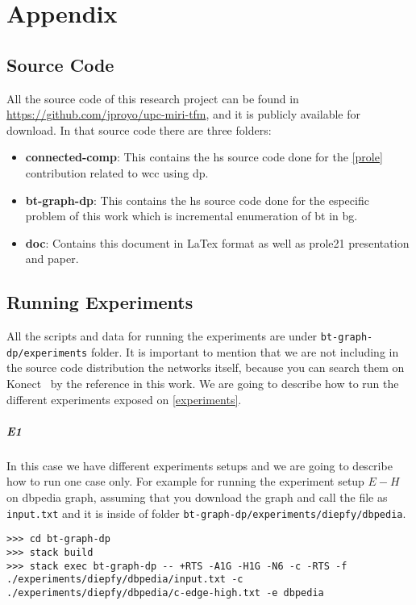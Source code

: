 \chapter{Appendix}
\section{Source Code}
All the source code of this research project can be found in \url{https://github.com/jproyo/upc-miri-tfm}, and it is publicly available for download.
In that source code there are three folders:

\begin{itemize}
  \item \textbf{connected-comp}: This contains the \acrshort{hs} source code done for the \autoref{prole} contribution related to \acrfull{wcc} using \acrshort{dp}.
  \item \textbf{bt-graph-dp}: This contains the \acrshort{hs} source code done for the especific problem of this work which is incremental enumeration of \acrlong{bt} in \acrlong{bg}.
  \item \textbf{doc}: Contains this document in LaTex format as well as \acrshort{prole21} presentation and paper.
\end{itemize}

\section{Running Experiments}
All the scripts and data for running the experiments are under \texttt{bt-graph-dp/experiments} folder.
It is important to mention that we are not including in the source code distribution the networks itself, because you can search them on Konect~\cite{konect} by the reference in this work.
We are going to describe how to run the different experiments exposed on \autoref{experiments}. 

\paragraph{E1} In this case we have different experiments setups and we are going to describe how to run one case only.
For example for running the experiment setup $E-H$ on \acrshort{dbpedia} graph, assuming that you download the graph and call the file as 
\texttt{input.txt} and it is inside of folder \texttt{bt-graph-dp/experiments/diepfy/dbpedia}.
\begin{verbatim}
>>> cd bt-graph-dp
>>> stack build
>>> stack exec bt-graph-dp -- +RTS -A1G -H1G -N6 -c -RTS -f ./experiments/diepfy/dbpedia/input.txt -c ./experiments/diepfy/dbpedia/c-edge-high.txt -e dbpedia
\end{verbatim}


